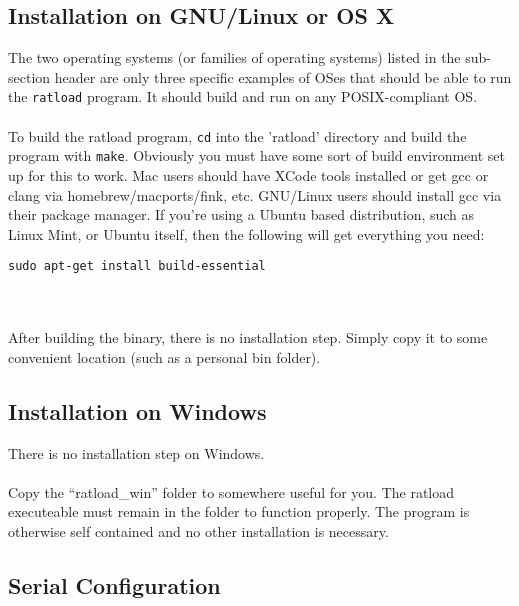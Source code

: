 \documentclass[notitlepage]{article}
\begin{document}
\subsection{Installation on GNU/Linux or OS X}
The two operating systems (or families of operating systems) listed in the sub-section header are only three specific examples of OSes that should be able to run the \texttt{ratload} program. It should build and run on any POSIX-compliant OS.\\\\
To build the ratload program, \texttt{cd} into the 'ratload' directory and build the program with \texttt{make}. Obviously you must have some sort of build environment set up for this to work. Mac users should have XCode tools installed or get gcc or clang via homebrew/macports/fink, etc. GNU/Linux users should install gcc via their package manager. If you're using a Ubuntu based distribution, such as Linux Mint, or Ubuntu itself, then the following will get everything you need:\\
\centerline{\texttt{sudo apt-get install build-essential}}\\\\
After building the binary, there is no installation step. Simply copy it to some convenient location (such as a personal bin folder).

\subsection{Installation on Windows}
There is no installation step on Windows.\\\\
Copy the ``ratload_win'' folder to somewhere useful for you. The ratload executeable must remain in the folder to function properly. The program is otherwise self contained and no other installation is necessary.


\subsection{Serial Configuration}
\end{document}
